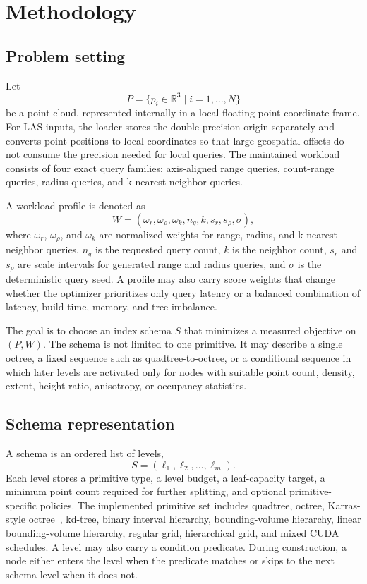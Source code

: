 \section{Methodology}
\label{sec:methodology}

\subsection{Problem setting}

Let
\begin{equation}
P = \{p_i \in \mathbb{R}^3 \mid i = 1,\ldots,N\}
\end{equation}
be a point cloud, represented internally in a local floating-point coordinate frame. For LAS inputs, the loader stores the double-precision origin separately and converts point positions to local coordinates so that large geospatial offsets do not consume the precision needed for local queries. The maintained workload consists of four exact query families: axis-aligned range queries, count-range queries, radius queries, and k-nearest-neighbor queries.

A workload profile is denoted as
\begin{equation}
W = (\omega_r,\omega_\rho,\omega_k,n_q,k,s_r,s_\rho,\sigma),
\end{equation}
where $\omega_r$, $\omega_\rho$, and $\omega_k$ are normalized weights for range, radius, and k-nearest-neighbor queries, $n_q$ is the requested query count, $k$ is the neighbor count, $s_r$ and $s_\rho$ are scale intervals for generated range and radius queries, and $\sigma$ is the deterministic query seed. A profile may also carry score weights that change whether the optimizer prioritizes only query latency or a balanced combination of latency, build time, memory, and tree imbalance.

The goal is to choose an index schema $S$ that minimizes a measured objective on $(P,W)$. The schema is not limited to one primitive. It may describe a single octree, a fixed sequence such as quadtree-to-octree, or a conditional sequence in which later levels are activated only for nodes with suitable point count, density, extent, height ratio, anisotropy, or occupancy statistics.

\subsection{Schema representation}

A schema is an ordered list of levels,
\begin{equation}
S = (\ell_1,\ell_2,\ldots,\ell_m).
\end{equation}
Each level stores a primitive type, a level budget, a leaf-capacity target, a minimum point count required for further splitting, and optional primitive-specific policies. The implemented primitive set includes quadtree, octree, Karras-style octree~\cite{karras2012lbvh}, kd-tree, binary interval hierarchy, bounding-volume hierarchy, linear bounding-volume hierarchy, regular grid, hierarchical grid, and mixed CUDA schedules. A level may also carry a condition predicate. During construction, a node either enters the level when the predicate matches or skips to the next schema level when it does not.

